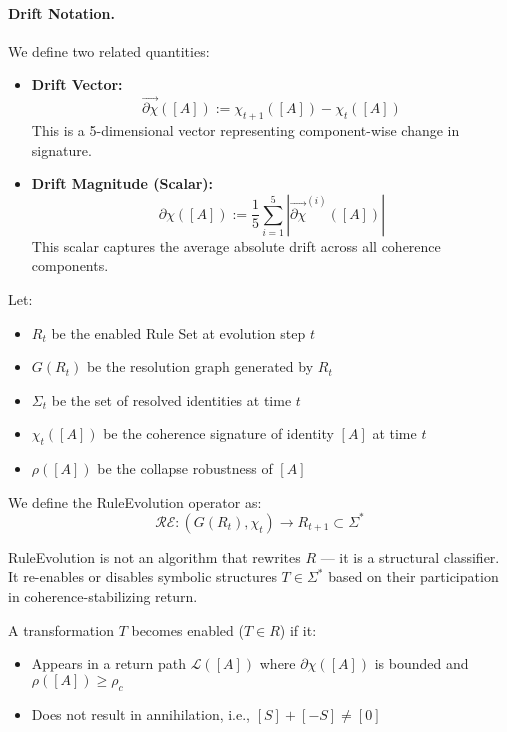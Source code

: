 \paragraph{Drift Notation.}
We define two related quantities:

\begin{itemize}
    \item \textbf{Drift Vector:}
    \[
    \vec{\partial \chi}([A]) := \chi_{t+1}([A]) - \chi_t([A])
    \]
    This is a 5-dimensional vector representing component-wise change in signature.

    \item \textbf{Drift Magnitude (Scalar):}
    \[
    \partial \chi([A]) := \frac{1}{5} \sum_{i=1}^5 \left| \vec{\partial \chi}^{(i)}([A]) \right|
    \]
    This scalar captures the average absolute drift across all coherence components.
\end{itemize}

Let:
\begin{itemize}
  \item $R_t$ be the enabled Rule Set at evolution step $t$
  \item $G(R_t)$ be the resolution graph generated by $R_t$
  \item $\Sigma_t$ be the set of resolved identities at time $t$
  \item $\chi_t([A])$ be the coherence signature of identity $[A]$ at time $t$
  \item $\rho([A])$ be the collapse robustness of $[A]$
\end{itemize}

We define the RuleEvolution operator as:
\begin{equation} \label{eq:ruleevolution-operator}
\mathcal{RE} : (G(R_t), \chi_t) \longrightarrow R_{t+1} \subset \Sigma^*
\end{equation}

RuleEvolution is not an algorithm that rewrites $R$ — it is a structural classifier.  
It re-enables or disables symbolic structures $T \in \Sigma^*$ based on their participation in coherence-stabilizing return.

A transformation $T$ becomes enabled ($T \in R$) if it:
\begin{itemize}
  \item Appears in a return path $\mathcal{L}([A])$ where $\partial \chi([A])$ is bounded and $\rho([A]) \geq \rho_c$
  \item Does not result in annihilation, i.e., $[S] + [-S] \ne [0]$
\end{itemize}

